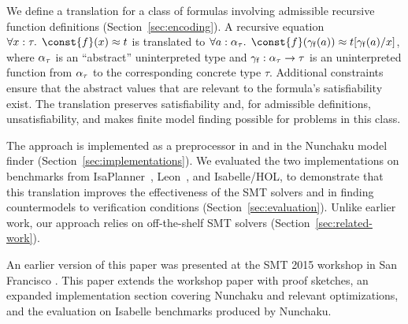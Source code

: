 We define a translation for a class of
formulas involving admissible recursive function definitions
(Section~\ref{sec:encoding}). A
recursive equation $\forall x : \tau.\;\, \const{f}(x) \teq t$
is translated to
$\forall a :\nobreak
\fargtype{\tau}.\allowbreak\;\, \const{f}(\farg{\con{f}}(a)) \teq t[\farg{\con{f}}(a)/x]$, where
$\alpha_{\tau}$ is an ``abstract'' uninterpreted type and $\gamma_{\mathsf{f}} :
\alpha_{\tau} \to \tau$ is an uninterpreted function
from $\alpha_{\tau}$ to the corresponding concrete type $\tau$. 
Additional constraints ensure that the abstract values that are relevant
to the formula's satisfiability
exist. The translation preserves satisfiability and, for admissible definitions,
unsatisfiability, and makes finite model finding possible for problems in this
class.

The approach is implemented as a preprocessor in \cvc and in the Nunchaku
model finder (Section~\ref{sec:implementations}).
%
We evaluated the two implementations on benchmarks from
IsaPlanner~\cite{DBLP:conf/itp/JohanssonDB10}, Leon~\cite{blanc2013overview},
and Isabelle/HOL, to demonstrate that this translation improves the
effectiveness of the SMT solvers \cvc and \ziii in finding countermodels to
verification conditions (Section~\ref{sec:evaluation}). Unlike earlier work,
our approach relies on off-the-shelf SMT solvers
(Section~\ref{sec:related-work}).

An earlier version of this paper was presented at the SMT 2015 workshop in San
Francisco \cite{reynolds-et-al-2015-smt}. This paper extends the workshop
paper with proof sketches, an expanded implementation section covering
Nunchaku and relevant \cvc optimizations, %
and the evaluation on Isabelle benchmarks produced by Nunchaku.


